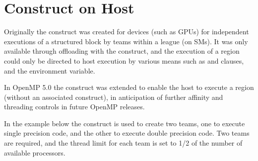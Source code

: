 \pagebreak
\section{ Construct on Host}
\label{sec:host_teams}

Originally the  construct was created for devices (such as GPUs)
for independent executions of a structured block by teams within a league (on SMs).
It was only available through offloading with the  construct,
and the execution of a  region could only be directed to host
execution by various means such as  and  clauses,
and the  environment variable.

In OpenMP 5.0 the  construct was extended to enable the host
to execute a  region (without an associated  construct), 
in anticipation of further affinity and threading controls in future OpenMP releases.

In the example below the  construct is used to create two
teams, one to execute single precision code, and the other
to execute double precision code. Two teams are required, and
the thread limit for each team is set to 1/2 of the number of 
available processors.



